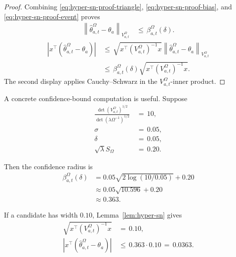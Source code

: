 \documentclass{article} %
\begin{document}
\begin{proof}
Combining \eqref{eq:hyper-sn-proof-triangle}, \eqref{eq:hyper-sn-proof-bias}, and \eqref{eq:hyper-sn-proof-event} proves
\begin{equation}
\label{eq:hyper-sn-proof-param}
\begin{aligned}
\left\|
\widehat{\theta}_{a,t}^{\Omega}-\theta_a
\right\|_{V_{a,t}^{\Omega}}
&\,\leq\,
\beta_{a,t}^{\Omega}(\delta).
\end{aligned}
\end{equation}
\begin{equation}
\label{eq:hyper-sn-proof-pred}
\begin{aligned}
\left|
x^\top
\left(
\widehat{\theta}_{a,t}^{\Omega}-\theta_a
\right)
\right|
&\,\leq\,
\sqrt{x^\top\left(V_{a,t}^{\Omega}\right)^{-1}x}
\left\|
\widehat{\theta}_{a,t}^{\Omega}-\theta_a
\right\|_{V_{a,t}^{\Omega}}
\\
&\,\leq\,
\beta_{a,t}^{\Omega}(\delta)
\sqrt{x^\top\left(V_{a,t}^{\Omega}\right)^{-1}x}.
\end{aligned}
\end{equation}
The second display applies Cauchy--Schwarz in the
\(V_{a,t}^{\Omega}\)-inner product.
\end{proof}

A concrete confidence-bound computation is useful. Suppose
\begin{align}
\frac{
\det(V_{a,t}^{\Omega})^{1/2}
}{
\det(\lambda\Omega^{-1})^{1/2}
}
&\,=\,
10,
\label{eq:hyper-bound-example-det-ratio}
\\
\sigma
&\,=\,
0.05,
\label{eq:hyper-bound-example-sigma}
\\
\delta
&\,=\,
0.05,
\label{eq:hyper-bound-example-delta}
\\
\sqrt{\lambda}S_{\Omega}
&\,=\,
0.20.
\label{eq:hyper-bound-example-bias}
\end{align}

Then the confidence radius is
\begin{equation}
\label{eq:hyper-bound-example-beta}
\begin{aligned}
\beta_{a,t}^{\Omega}(\delta)
&=
0.05
\sqrt{
2\log(10/0.05)
}
+
0.20
\\
&\approx
0.05\sqrt{10.596}+0.20
\\
&\approx
0.363 .
\end{aligned}
\end{equation}

If a candidate has width \(0.10\), Lemma~\ref{lem:hyper-sn} gives
\begin{align}
\sqrt{x^\top(V_{a,t}^{\Omega})^{-1}x}
&\,=\,
0.10,
\label{eq:hyper-bound-example-width}
\\
\left|
x^\top
\left(
\widehat{\theta}_{a,t}^{\Omega}-\theta_a
\right)
\right|
&\,\leq\,
0.363\cdot 0.10
\,=\,
0.0363.
\label{eq:hyper-bound-example-pred}
\end{align}
\end{document}
